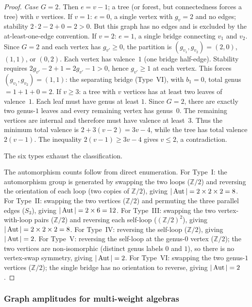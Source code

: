 \begin{proof}
\emph{Case $G = 2$.} Then $e = v - 1$; a tree (or forest,
but connectedness forces a tree) with $v$ vertices.
If $v = 1$: $e = 0$, a single vertex with $g_v = 2$ and no
edges; stability $2 \cdot 2 - 2 + 0 = 2 > 0$. But this
graph has no edges and is excluded by the at-least-one-edge
convention.
If $v = 2$: $e = 1$, a single bridge connecting $v_1$ and $v_2$.
Since $G = 2$ and each vertex has $g_{v'} \geq 0$, the
partition is $(g_{v_1}, g_{v_2}) = (2,0)$, $(1,1)$, or $(0,2)$.
Each vertex has valence~$1$ (one bridge half-edge).
Stability requires $2g_{v'} - 2 + 1 = 2g_{v'} - 1 > 0$, hence
$g_{v'} \geq 1$ at each vertex. This forces
$(g_{v_1}, g_{v_2}) = (1,1)$: the separating bridge (Type~VI),
with $b_1 = 0$, total genus $= 1 + 1 + 0 = 2$.
If $v \geq 3$: a tree with $v$ vertices has
at least two leaves of valence~$1$. Each leaf must have
genus at least $1$. Since $G=2$, there are exactly two
genus-$1$ leaves and every remaining vertex has genus~$0$.
The remaining vertices are internal and therefore must have
valence at least~$3$. Thus the minimum total valence is
$2 + 3(v-2) = 3v - 4$, while the tree has total valence
$2(v-1)$. The inequality $2(v-1) \geq 3v - 4$ gives
$v \leq 2$, a contradiction.

The six types exhaust the classification.

The automorphism counts follow from direct enumeration. For
Type~I: the automorphism group is generated by swapping the two
loops ($\mathbb{Z}/2$) and reversing the orientation of each
loop (two copies of $\mathbb{Z}/2$), giving
$|\operatorname{Aut}| = 2 \times 2 \times 2 = 8$. For Type~II: swapping the
two vertices ($\mathbb{Z}/2$) and permuting the three parallel
edges ($S_3$), giving $|\operatorname{Aut}| = 2 \times 6 = 12$. For
Type~III: swapping the two vertex-with-loop pairs
($\mathbb{Z}/2$) and reversing each self-loop
($(\mathbb{Z}/2)^2$), giving
$|\operatorname{Aut}| = 2 \times 2 \times 2 = 8$. For Type~IV: reversing
the self-loop ($\mathbb{Z}/2$), giving $|\operatorname{Aut}| = 2$.
For Type~V: reversing the self-loop at the genus-$0$ vertex
($\mathbb{Z}/2$); the two vertices are non-isomorphic
(distinct genus labels $0$ and $1$), so there is no
vertex-swap symmetry, giving $|\operatorname{Aut}| = 2$.
For Type~VI: swapping the two genus-$1$ vertices
($\mathbb{Z}/2$); the single bridge has no orientation to
reverse, giving $|\operatorname{Aut}| = 2$.
\end{proof}

\subsubsection{Graph amplitudes for multi-weight algebras}

